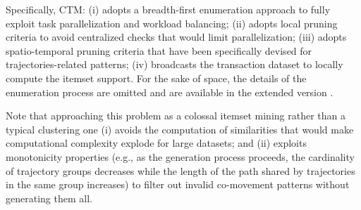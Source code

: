 \documentclass[
]{ceurart}
\begin{document}
Specifically, CTM:
(i) adopts a breadth-first enumeration approach to fully exploit task parallelization and workload balancing;
(ii) adopts local pruning criteria to avoid centralized checks that would limit parallelization;
(iii) adopts spatio-temporal pruning criteria that have been specifically devised for trajectories-related patterns;
(iv) broadcasts the transaction dataset %
to locally compute the itemset support.
For the sake of space, the details of the enumeration process are omitted and are available in the extended version \cite{DBLP:journals/eswa/FranciaGG24}.

Note that approaching this problem as a colossal itemset mining rather than a typical clustering one 
(i) avoids the computation of similarities that would make computational complexity explode for large datasets;
and (ii) exploits monotonicity properties (e.g., as the generation process proceeds, the cardinality of trajectory groups decreases while the length of the path shared by trajectories in the same group increases) to filter out invalid co-movement patterns without generating them all.

\end{document}
